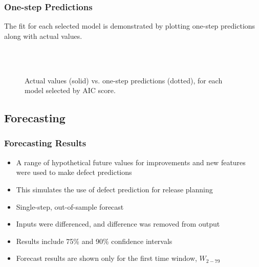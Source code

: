 \documentclass[presentation]{beamer}
\begin{document}
\begin{frame}[t]
\frametitle{One-step Predictions}
\small{The fit for each selected model is demonstrated by plotting one-step predictions along with actual values.}

\begin{figure}[htbp]
\centering
\vspace{-.25in}
\\
\vspace{-.6in}
\\
\vspace{-.6in}
%
\caption{Actual values (solid) vs. one-step predictions (dotted), for each model selected by AIC score.}
\end{figure}
\end{frame}


\subsection{Forecasting}

\begin{frame}[t]
\frametitle{Forecasting Results}
\begin{itemize}
\item{A range of hypothetical future values for improvements and new features were used to make defect predictions}
\item{This simulates the use of defect prediction for release planning}
\item{Single-step, out-of-sample forecast}
\item{Inputs were differenced, and difference was removed from output}
\item{Results include 75\% and 90\% confidence intervals}
\item{Forecast results are shown only for the first time window, $W_{2-79}$}
\end{itemize}
\end{frame}
\end{document}
